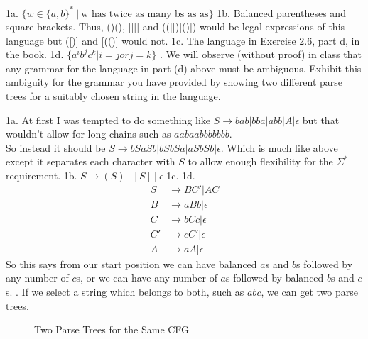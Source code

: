 

\usepackage{subfigure}
\usepackage{graphicx}



\homeworkheader{\classnameandsection}

\begin{problem}{1}
  1a. $\{w \in \{a,b\}^*\ |\ \text{w has twice as many bs as as} \}$
  \br
  1b. Balanced parentheses and square brackets. Thus, ()(), [][] and (([])[()]) would be legal expressions of this
     language but ([)] and [(()] would not.
  \br
  1c. The language in Exercise 2.6, part d, in the book.
  \br
  1d. $\{ a^ib^jc^k | i = j or j = k \}$
  . We will observe (without proof) in class that any grammar for the language in part (d) above must be ambiguous.
     Exhibit this ambiguity for the grammar you have provided by showing two different parse trees for a suitably chosen
     string in the language.
  \begin{solution}
    1a. At first I was tempted to do something like $S \rightarrow bab | bba | abb | A | \epsilon$ but that wouldn't
    allow for long chains such as $aabaabbbbbbb$. \\ So instead it should be $S \rightarrow bSaSb | bSbSa |
    aSbSb|\epsilon$. Which is much like above except it separates each character with $S$ to allow enough flexibility
    for the $\Sigma^*$ requirement.
    \br
    1b. $S \rightarrow (S)\ |\ [S]\ |\ \epsilon$
    \br
    1c.
    \br
    1d.
    \begin{align*}
      S &\rightarrow BC'|AC \\
      B &\rightarrow aBb | \epsilon \\
      C &\rightarrow bCc | \epsilon \\
      C' &\rightarrow cC' | \epsilon \\
      A &\rightarrow aA | \epsilon
    \end{align*}
    So this says from our start position we can have balanced $a$s and $b$s followed by any number of $c$s, or we can
    have any number of $a$s followed by balanced $b$s and $c$s.
    . If we select a string which belongs to both, such as $abc$, we can get two parse trees.
    \begin{figure}[H]
      \centering
      \caption{Two Parse Trees for the Same CFG}
\end{figure}
\end{solution}
\end{problem}
